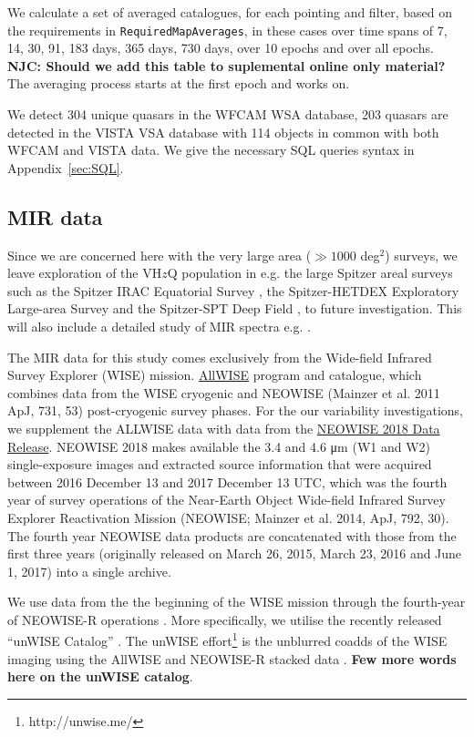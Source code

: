 \documentclass[usenatbib]{mnras}
\begin{document}
    We calculate a set of averaged catalogues, for each pointing and filter, based
    on the requirements in \verb+RequiredMapAverages+, in these cases over time
    spans of 7, 14, 30, 91, 183 days, 365 days, 730 days, over 10 epochs and
    over all epochs. {\bf NJC: Should we add this table to suplemental online
    only material?} The averaging process starts at the first epoch and works on.

    We detect 304 unique quasars in the WFCAM WSA database, 203 quasars are 
    detected in the VISTA VSA database with 114 objects in common with both
    WFCAM and VISTA data.  We give the necessary SQL queries syntax in Appendix~\ref{sec:SQL}.


\subsection{MIR data}
Since we are concerned here with the very large area ($\gg1000$ deg$^2$) surveys, we leave exploration of the VH$z$Q population in e.g. the large Spitzer areal surveys such as the Spitzer IRAC Equatorial Survey \citep[SpIES; ][]{Timlin2016}, the Spitzer-HETDEX Exploratory Large-area Survey \citep[SHELA; ][]{Papovich2016} and the Spitzer-SPT Deep Field \citep[SSDF; ][]{Ashby2013}, to future investigation. This will also include a detailed study of MIR spectra e.g. \citet{Lambrides2018}.

The MIR data for this study comes exclusively from the Wide-field Infrared Survey Explorer (WISE) mission. 
\href{http://wise2.ipac.caltech.edu/docs/release/allwise/}{AllWISE}
program and catalogue, which combines data from the WISE cryogenic and
NEOWISE (Mainzer et al. 2011 ApJ, 731, 53) post-cryogenic survey
phases. For the our variability investigations, we supplement the
ALLWISE data with data from the
\href{http://wise2.ipac.caltech.edu/docs/release/neowise/neowise_2018_release_intro.html}{NEOWISE
2018 Data Release}. NEOWISE 2018 makes available the 3.4 and 4.6 μm
(W1 and W2) single-exposure images and extracted source information
that were acquired between 2016 December 13 and 2017 December 13 UTC,
which was the fourth year of survey operations of the Near-Earth
Object Wide-field Infrared Survey Explorer Reactivation Mission
(NEOWISE; Mainzer et al. 2014, ApJ, 792, 30). The fourth year NEOWISE
data products are concatenated with those from the first three years
(originally released on March 26, 2015, March 23, 2016 and June 1,
2017) into a single archive.

We use data from the the beginning of the WISE mission \citep[2010 January; ][]{Wright2010} through the fourth-year of NEOWISE-R operations \citep[2017 December;]{Mainzer2011}.  More specifically, we utilise the recently released ``unWISE Catalog'' \citet{MeisnerSchlafly2019}. The unWISE effort\footnote{http://unwise.me/} is the unblurred coadds of the WISE imaging using the AllWISE and NEOWISE-R stacked data \citep{Lang2014, Meisner2018a, Meisner2018b}. {\bf Few more words here on the unWISE catalog}. 
\end{document}
